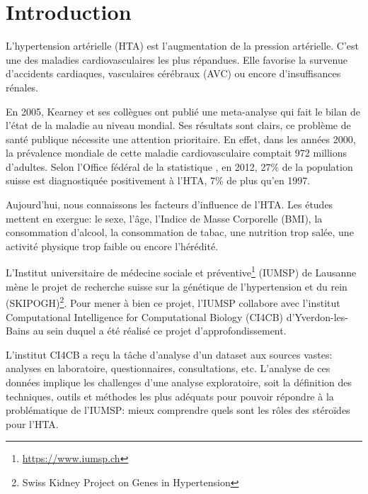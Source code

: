 \chapter{Introduction}

	
	L'hypertension artérielle (HTA) est l'augmentation de la pression artérielle. C'est une des maladies cardiovasculaires les plus répandues. Elle favorise la survenue d’accidents cardiaques, vasculaires cérébraux (AVC) ou encore d'insuffisances rénales.

	En 2005, Kearney et ses collègues \cite{Kearney:2005} ont publié une meta-analyse qui fait le bilan de l'état de la maladie au niveau mondial. Ses résultats sont clairs, ce problème de santé publique nécessite une attention prioritaire. En effet, dans les années 2000, la prévalence mondiale de cette maladie cardiovasculaire comptait 972 millions d'adultes. Selon l'Office fédéral de la statistique \cite{OFS:HTA}, en 2012, 27\% de la population suisse est diagnostiquée positivement à l'HTA, 7\% de plus qu'en 1997.

	Aujourd'hui, nous connaissons les facteurs d'influence de l'HTA. Les études mettent en exergue: le sexe, l'âge, l'Indice de Masse Corporelle (BMI), la consommation d'alcool, la consommation de tabac, une nutrition trop salée, une activité physique trop faible ou encore l'hérédité. %

	L'Institut universitaire de médecine sociale et préventive\footnote{\url{https://www.iumsp.ch}} (IUMSP) de Lausanne mène le projet de recherche suisse sur la génétique de l’hypertension et du rein (SKIPOGH)\footnote{Swiss Kidney Project on Genes in Hypertension}. Pour mener à bien ce projet, l'IUMSP collabore avec l'institut Computational Intelligence for Computational Biology (CI4CB) d'Yverdon-les-Bains au sein duquel a été réalisé ce projet d'approfondissement.

	L'institut CI4CB a reçu la tâche d'analyse d'un dataset aux sources vastes: analyses en laboratoire, questionnaires, consultations, etc. L'analyse de ces données implique les challenges d'une analyse exploratoire, soit la définition des techniques, outils et méthodes les plus adéquats pour pouvoir répondre à la problématique de l'IUMSP: mieux comprendre quels sont les rôles des stéroïdes pour l'HTA. 

